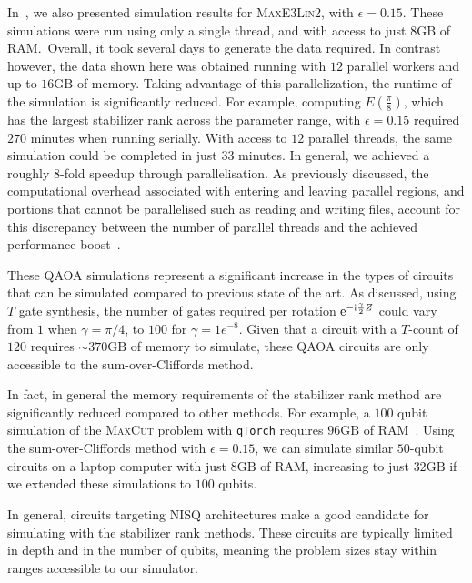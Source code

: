 In~\cite{Bravyi2018}, we also presented simulation results for \textsc{MaxE3Lin2}, with $\epsilon=0.15$. These simulations were run using only a single thread, and with access to just $8\mathrm{GB}$ of RAM.\ Overall, it took several days to generate the data required. In contrast however, the data shown here was obtained running with $12$ parallel workers and up to $16\mathrm{GB}$ of memory. Taking advantage of this parallelization, the runtime of the simulation is significantly reduced. For example, computing $E(\frac{\pi}{8})$, which has the largest stabilizer rank across the parameter range, with $\epsilon=0.15$ required $270$ minutes when running serially. With access to $12$ parallel threads, the same simulation could be completed in just $33$ minutes. In general, we achieved a roughly $8$-fold speedup through parallelisation. As previously discussed, the computational overhead associated with entering and leaving parallel regions, and portions that cannot be parallelised such as reading and writing files, account for this discrepancy between the number of parallel threads and the achieved performance boost~\cite{Amdahl1967}.\par
These QAOA simulations represent a significant increase in the types of circuits that can be simulated compared to previous state of the art. As discussed, using $T$ gate synthesis, the number of gates required per rotation $\mathrm{e}^{-\mathrm{i}\frac{\gamma}{2}Z}$ could vary from $1$ when $\gamma=\pi/4$, to $100$ for $\gamma=1e^{-8}$. Given that a circuit with a $T$-count of $120$ requires $\sim 370\mathrm{GB}$ of memory to simulate, these QAOA circuits are only accessible to the sum-over-Cliffords method.\par
In fact, in general the memory requirements of the stabilizer rank method are significantly reduced compared to other methods. For example, a $100$ qubit simulation of the \textsc{MaxCut} problem with \texttt{qTorch} requires $96\mathrm{GB}$ of RAM~\cite{SchuylerFried2017}. Using the sum-over-Cliffords method with $\epsilon=0.15$, we can simulate similar $50$-qubit circuits on a laptop computer with just $8\mathrm{GB}$ of RAM, increasing to just $32\mathrm{GB}$ if we extended these simulations to $100$ qubits.\par
In general, circuits targeting NISQ architectures make a good candidate for simulating with the stabilizer rank methods. These circuits are typically limited in depth and in the number of qubits, meaning the problem sizes stay within ranges accessible to our simulator.\par

